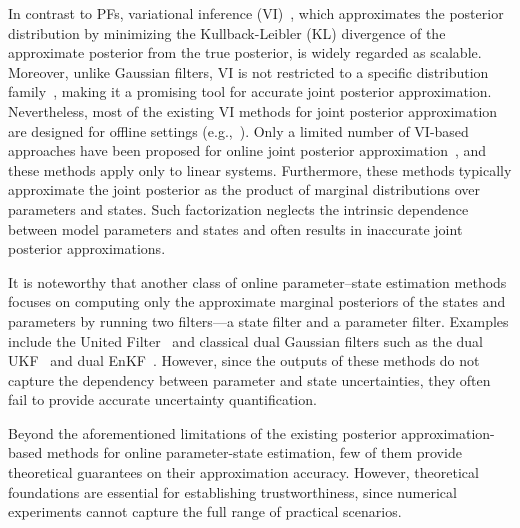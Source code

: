 \documentclass[preprint,3p,times]{elsarticle}
\begin{document}
In contrast to PFs, variational inference (VI)~\cite{vi_def}, which approximates the posterior distribution by minimizing the Kullback-Leibler (KL) divergence of the approximate posterior from the true posterior, is widely regarded as scalable. Moreover, unlike Gaussian filters, VI is not restricted to a specific distribution family~\cite{online_variational_filtering}, making it a promising tool for accurate joint posterior approximation. Nevertheless, most of the existing VI methods for joint posterior approximation are designed for offline settings (e.g.,~\cite{IFT,Ryder2018BBVI_SDE,variational_state_parameter}). Only a limited number of VI-based approaches have been proposed for online joint posterior approximation~\cite{online_rl, online_VI_linear}, and these methods apply only to linear systems. Furthermore, these methods typically approximate the joint posterior as the product of marginal distributions over parameters and states. Such factorization neglects the intrinsic dependence between model parameters and states and often results in inaccurate joint posterior approximations.

It is noteworthy that another class of online parameter–state estimation methods focuses on computing only the approximate marginal posteriors of the states and parameters by running two filters—a state filter and a parameter filter. Examples include the United Filter~\cite{UnitedFilter} and classical dual Gaussian filters such as the dual UKF~\cite{dual_ukf_1} and dual EnKF~\cite{dual_enkf}. However, since the outputs of these methods do not capture the dependency between parameter and state uncertainties, they often fail to provide accurate uncertainty quantification. 

Beyond the aforementioned limitations of the existing posterior approximation-based methods for online parameter-state estimation, few of them provide theoretical guarantees on their approximation accuracy. However, theoretical foundations are essential for establishing trustworthiness, since numerical experiments cannot capture the full range of practical scenarios.
\end{document}
